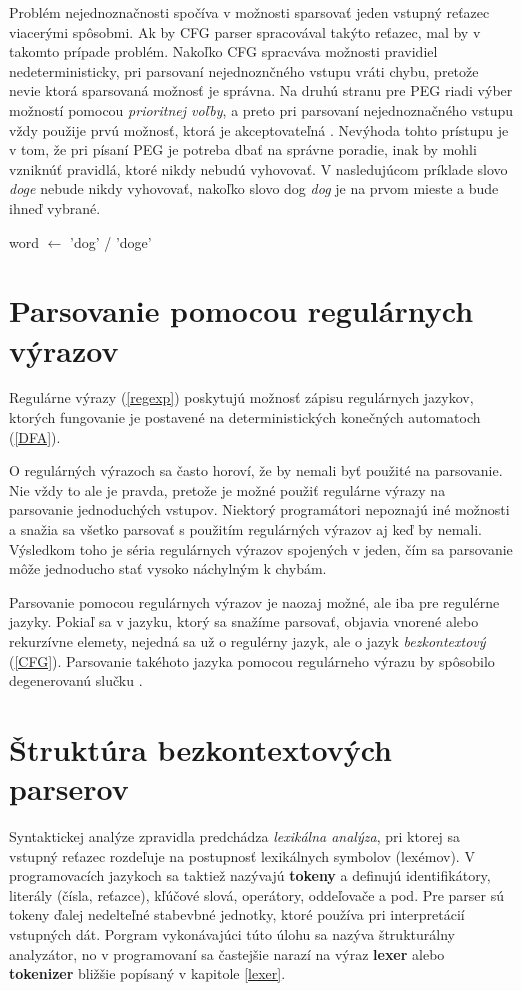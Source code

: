 Problém nejednoznačnosti spočíva v možnosti sparsovať jeden vstupný reťazec viacerými spôsobmi. Ak by CFG parser spracovával takýto reťazec, mal by v takomto prípade problém. Nakoľko CFG spracváva možnosti pravidiel nedeterministicky, pri parsovaní nejednoznčného vstupu vráti chybu, pretože nevie ktorá sparsovaná možnosť je správna. Na druhú stranu pre PEG riadi výber možností pomocou \textit{prioritnej voľby}, a preto pri parsovaní nejednoznačného vstupu vždy použije prvú možnosť, ktorá je akceptovateľná \cite{ford2004parsing}. Nevýhoda tohto prístupu je v tom, že pri písaní PEG je potreba dbať na správne poradie, inak by mohli vzniknúť pravidlá, ktoré nikdy nebudú vyhovovať. V nasledujúcom príklade slovo \textit{doge} nebude nikdy vyhovovať, nakoľko slovo dog \textit{dog} je na prvom mieste a bude ihneď vybrané.

\begin{center}
word $\leftarrow$ 'dog' / 'doge'
\end{center}

\section{Parsovanie pomocou regulárnych výrazov}
Regulárne výrazy (\ref{regexp}) poskytujú možnosť zápisu regulárnych jazykov, ktorých fungovanie je postavené na deterministických konečných automatoch (\ref{DFA}).

O regulárných výrazoch sa často horoví, že by nemali byť použité na parsovanie. Nie vždy to ale je pravda, pretože je možné použiť regulárne výrazy na parsovanie jednoduchých vstupov. Niektorý programátori nepoznajú iné možnosti a snažia sa všetko parsovať s použitím regulárných výrazov aj keď by nemali. Výsledkom toho je séria regulárnych výrazov spojených v jeden, čím sa parsovanie môže jednoducho stať vysoko náchylným k chybám.

Parsovanie pomocou regulárnych výrazov je naozaj možné, ale iba pre regulérne jazyky. Pokiaľ sa v jazyku, ktorý sa snažíme parsovať, objavia vnorené alebo rekurzívne elemety, nejedná sa už o regulérny jazyk, ale o jazyk \textit{bezkontextový} (\ref{CFG}). Parsovanie takéhoto jazyka pomocou regulárneho výrazu by spôsobilo degenerovanú slučku \cite{ford2004parsing}. 

\section{Štruktúra bezkontextových parserov}
Syntaktickej analýze zpravidla predchádza \textit{lexikálna analýza}, pri ktorej sa vstupný reťazec rozdeľuje na postupnosť lexikálnych symbolov (lexémov). V programovacích jazykoch sa taktiež nazývajú \textbf{tokeny} a definujú identifikátory, literály (čísla, reťazce), kľúčové slová, operátory, oddeľovače a pod. Pre parser sú tokeny ďalej nedelteľné stabevbné jednotky, ktoré používa pri interpretácií vstupných dát. Porgram vykonávajúci túto úlohu sa nazýva štrukturálny analyzátor, no v programovaní sa častejšie narazí na výraz \textbf{lexer} alebo \textbf{tokenizer} bližšie popísaný v kapitole \ref{lexer}. 

